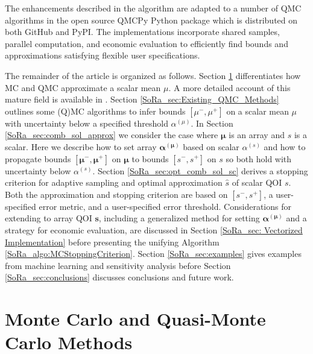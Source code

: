 \documentclass[graybox]{svmult}
\begin{document}
The enhancements described in the algorithm are adapted to a number of QMC algorithms in the open source QMCPy Python package \cite{QMCPy} which is distributed on both GitHub and PyPI. The implementations incorporate shared samples, parallel computation, and economic evaluation to efficiently find bounds and approximations satisfying flexible user specifications.

The remainder of the article is organized as follows. Section \ref{SoRa_sec:MCM} differentiates how MC and QMC approximate a scalar mean $\mu$. A more detailed account of this mature field is available in \cite{niederreiter1992random}. Section \ref{SoRa_sec:Existing_QMC_Methods} outlines some (Q)MC algorithms to infer bounds $[\mu^-,\mu^+]$ on a scalar mean $\mu$ with uncertainty below a specified threshold $\alpha^{(\mu)}$. In Section \ref{SoRa_sec:comb_sol_approx} we consider the case where $\boldsymbol{\mu}$ is an array and $s$ is a scalar. Here we describe how to set array $\boldsymbol{\alpha}^{(\boldsymbol{\mu})}$ based on scalar $\alpha^{(s)}$ and how to propagate bounds $[\boldsymbol{\mu}^-,\boldsymbol{\mu}^+]$ on $\boldsymbol{\mu}$ to bounds $[s^-,s^+]$ on $s$ so both hold with uncertainty below $\alpha^{(s)}$. Section \ref{SoRa_sec:opt_comb_sol_sc} derives a stopping criterion for adaptive sampling and optimal approximation $\hat{s}$ of scalar QOI $s$. Both the approximation and stopping criterion are based on $[s^-,s^+]$, a user-specified error metric, and a user-specified error threshold. Considerations for extending to array QOI $\boldsymbol{s}$, including a generalized method for setting $\boldsymbol{\alpha}^{(\boldsymbol{\mu})}$ and a strategy for economic evaluation, are discussed in Section \ref{SoRa_sec: Vectorized Implementation} before presenting the unifying Algorithm \ref{SoRa_algo:MCStoppingCriterion}. Section \ref{SoRa_sec:examples} gives examples from machine learning and sensitivity analysis before Section \ref{SoRa_sec:conclusions} discusses conclusions and future work.   

\section{Monte Carlo and Quasi-Monte Carlo Methods} \label{SoRa_sec:MCM}
\end{document}
